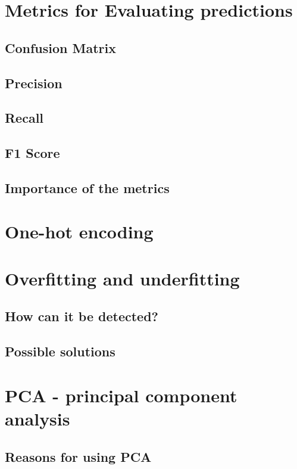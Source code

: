 \section{Metrics for Evaluating predictions}

\subsection{Confusion Matrix}
\subsection{Precision}
\subsection{Recall}
\subsection{F1 Score}
\subsection{Importance of the metrics}

\section{One-hot encoding}

\section{Overfitting and underfitting}

\subsection{How can it be detected?}

\subsection{Possible solutions}

\section{PCA - principal component analysis}

\subsection{Reasons for using PCA}

